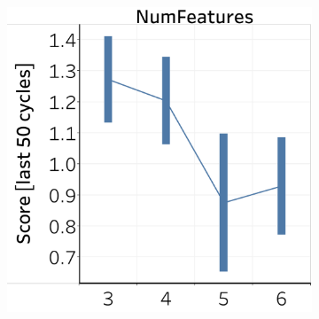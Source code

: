 \documentclass[letterpaper]{article} %
\newcommand{\?}{\mbox{?}}
\begin{document}
\begin{figure}[t]
  \centering
  \begin{subfigure}[b]{.47\columnwidth}
    \centering
    \includegraphics[width=\columnwidth]{2a.pdf}
    \caption{}
    \label{fig:complexity_nonstochastic}
  \end{subfigure}
  \hfill
  \begin{subfigure}[b]{.47\columnwidth}
  \centering

\end{subfigure}
\end{figure}
\end{document}
